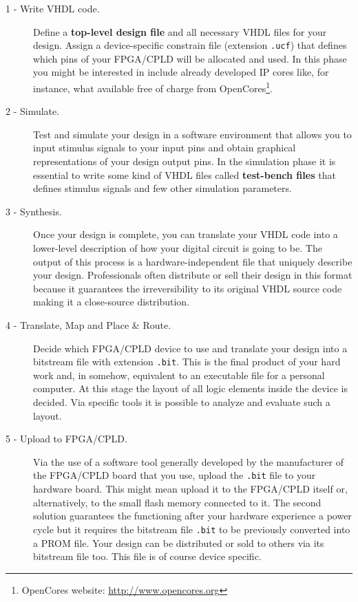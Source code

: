 \documentclass[13pt]{extreport}
\begin{document}
\begin{description}
\item[1 - Write VHDL code.] Define a \textbf{top-level design file} and all necessary VHDL files for your design. Assign a device-specific constrain file (extension \texttt{.ucf}) that defines which pins of your FPGA/CPLD will be allocated and used. In this phase you might be interested in include already developed IP cores like, for instance, what available free of charge from OpenCores\footnote{OpenCores website: \scriptsize\url{http://www.opencores.org}}.

\item[2 - Simulate.] Test and simulate your design in a software environment that allows you to input stimulus signals to your input pins and obtain graphical representations of your design output pins. In the simulation phase it is essential to write some kind of VHDL files called \textbf{test-bench files} that defines stimulus signals and few other simulation parameters.

\item [3 - Synthesis.] Once your design is complete, you can translate your VHDL code into a lower-level description of how your digital circuit is going to be. The output of this process is a hardware-independent file that uniquely describe your design. Professionals often distribute or sell their design in this format because it guarantees the irreversibility to its original VHDL source code making it a close-source distribution.

\item [4 - Translate, Map and Place \& Route.] Decide which FPGA/CPLD device to use and translate your design into a bitstream file with extension \texttt{.bit}. This is the final product of your hard work and, in somehow, equivalent to an executable file for a personal computer. At this stage the layout of all logic elements inside the device is decided. Via specific tools it is possible to analyze and evaluate such a layout.

\item [5 - Upload to FPGA/CPLD.] Via the use of a software tool generally developed by the manufacturer of the FPGA/CPLD board that you use, upload the \texttt{.bit} file to your hardware board. This might mean upload it to the FPGA/CPLD itself or, alternatively, to the small flash memory connected to it. The second solution guarantees the functioning after your hardware experience a power cycle but it requires the bitstream file \texttt{.bit} to be previously converted into a PROM file. Your design can be distributed or sold to others via its bitstream file too. This file is of course device specific.
\end{description}
\end{document}
